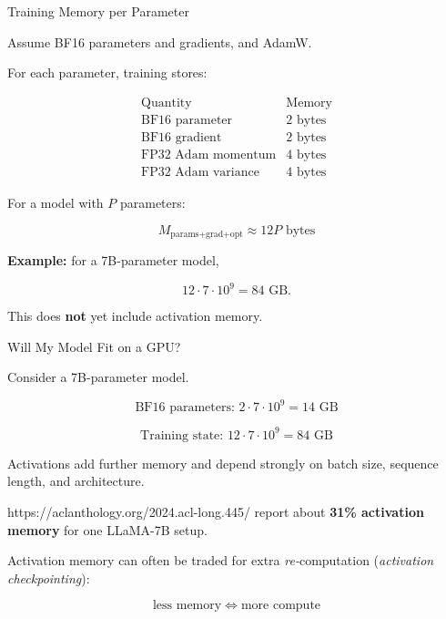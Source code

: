 \documentclass[11pt,compress,t,notes=noshow, xcolor=table]{beamer}
\begin{document}

\begin{vbframe}{Training Memory per Parameter}

Assume BF16 parameters and gradients, and AdamW.

For each parameter, training stores:

\[
\begin{array}{l|c}
\text{Quantity} & \text{Memory} \\
\hline
\text{BF16 parameter} & 2\text{ bytes} \\
\text{BF16 gradient} & 2\text{ bytes} \\
\text{FP32 Adam momentum} & 4\text{ bytes} \\
\text{FP32 Adam variance} & 4\text{ bytes}
\end{array}
\]

For a model with $P$ parameters:

\[
\boxed{
M_{\text{params+grad+opt}}
\approx
12P\text{ bytes}
}
\]

\textbf{Example:} for a 7B-parameter model,

\[
12 \cdot 7\cdot10^9
=
84\text{ GB}.
\]

This does \textbf{not} yet include activation memory.

\end{vbframe}


\begin{vbframe}{Will My Model Fit on a GPU?}

Consider a 7B-parameter model.

\[
\text{BF16 parameters: } 2 \cdot 7\cdot10^9 = 14\text{ GB}
\]

\[
\text{Training state: } 12 \cdot 7\cdot10^9 = 84\text{ GB}
\]

Activations add further memory and depend strongly on batch size,
sequence length, and architecture.

{https://aclanthology.org/2024.acl-long.445/}
report about \textbf{31\% activation memory} for one LLaMA-7B setup.

Activation memory can often be traded for extra \emph{re-}computation (\emph{activation checkpointing}):

\[
\boxed{\text{less memory} \;\Longleftrightarrow\; \text{more compute}}
\]

\end{vbframe}


\endlecture
\end{document}

